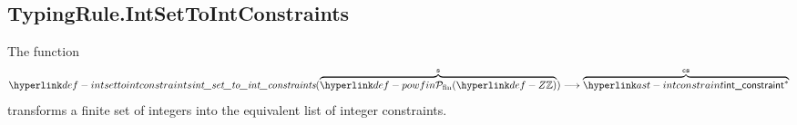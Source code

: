 \begin{mathpar}
\end{mathpar}

\begin{mathpar}
\end{mathpar}

\begin{mathpar}
\end{mathpar}

\subsection{TypingRule.IntSetToIntConstraints \label{sec:TypingRule.IntSetToIntConstraints}}
\hypertarget{def-intsettointconstraints}{}
The function
\[
\intsettointconstraints(\overname{\powfin{\Z}}{\vs})
\aslto \overname{\intconstraint^*}{\cs}
\]
transforms a finite set of integers into the equivalent list of integer constraints.

